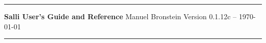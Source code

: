 % 
% 
% 
% 
% 
\thispagestyle{empty}
\begin{center}
\vskip 5cm
\hrule
\vskip 0.5cm
{\LARGE\bf Salli User's Guide and Reference}
\vskip 1cm
{\Large Manuel Bronstein}
\vskip 1cm
{\Large Version 0.1.12c -- \today}
\vskip 0.5cm
\hrule
\end{center}
\newpage

